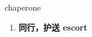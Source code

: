 
\begin{frame}
{\huge chaperone}
\begin{center}
\begin{enumerate}\Large
  \item \textbf{同行，护送 escort}
\end{enumerate}
\end{center}
\end{frame}
